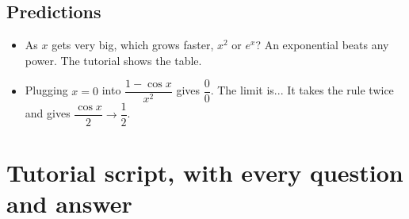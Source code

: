 \documentclass[11pt]{article}
\begin{document}
\subsection*{Predictions}\begin{itemize}
\item As $x$ gets very big, which grows faster, $x^2$ or $e^x$?  An exponential beats any power. The tutorial shows the table.
\item Plugging $x=0$ into $\dfrac{1-\cos x}{x^2}$ gives $\dfrac00$. The limit is...  It takes the rule twice and gives $\dfrac{\cos x}{2}\to\dfrac12$.
\end{itemize}
\section*{Tutorial script, with every question and answer}
\end{document}
